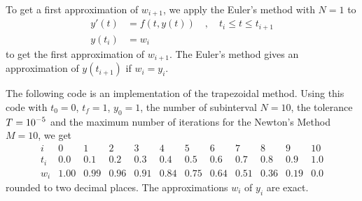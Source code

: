 \begin{egg}
To get a first approximation of $w_{i+1}$, we apply the Euler's method
with $N=1$ to
\[
\begin{split}
y'(t) &= f(t,y(t)) \quad , \quad t_i \leq t \leq t_{i+1} \\
y(t_i) &= w_i
\end{split}
\]
to get the first approximation of $w_{i+1}$.  The Euler's method gives
an approximation of $y(t_{i+1})$ if $w_i = y_i$.

The following code is an implementation of the trapezoidal method.
Using this code with $t_0=0$, $t_f=1$, $y_0=1$, the
number of subinterval $N=10$, the tolerance $\displaystyle T=10^{-5}$ and the
maximum number of iterations for the Newton's Method $M=10$, we get
\[
\begin{array}{c|ccccccccccc}
i & 0 & 1 & 2 & 3 & 4 & 5 & 6 & 7 & 8 & 9 & 10 \\
\hline
t_i & 0.0 & 0.1 & 0.2 & 0.3 & 0.4 & 0.5 & 0.6 & 0.7 & 0.8 & 0.9
& 1.0\\
\hline
w_i & 1.00 & 0.99 & 0.96 & 0.91 & 0.84 & 0.75 & 0.64 & 0.51 & 0.36 & 0.19
& 0.0
\end{array}
\]
rounded to two decimal places.  The approximations $w_i$ of $y_i$ are exact.
\end{egg}

